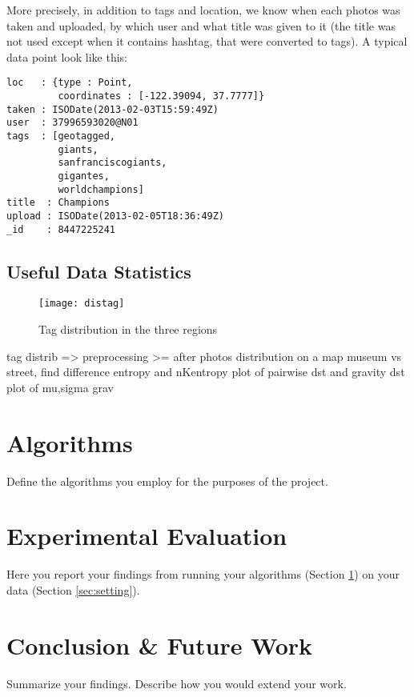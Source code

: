 More precisely, in addition to tags and location, we know when each photos was
taken and uploaded, by which user and what title was given to it (the title
was not used except when it contains hashtag, that were converted to tags). A
typical data point look like this:

\begin{verbatim}
loc   : {type : Point,
         coordinates : [-122.39094, 37.7777]}
taken : ISODate(2013-02-03T15:59:49Z)
user  : 37996593020@N01
tags  : [geotagged,
         giants,
         sanfranciscogiants,
         gigantes,
         worldchampions]
title  : Champions
upload : ISODate(2013-02-05T18:36:49Z)
_id    : 8447225241
\end{verbatim}

\subsection{Useful Data Statistics}

\begin{figure}[hbtp]
\texttt{[image: distag]}
\label{fig:distag}
\caption{Tag distribution in the three regions}
\end{figure}

tag distrib => preprocessing >= after
photos distribution on a map
museum vs street, find difference
entropy and nKentropy
plot of pairwise dst and gravity dst
plot of mu,sigma grav
\section{Algorithms}
\label{sec:algorithms}

Define the algorithms you employ for the purposes of the project.

\section{Experimental Evaluation}

Here you report your findings from running your algorithms (Section
\ref{sec:algorithms}) on your data (Section \ref{sec:setting}).

\section{Conclusion \& Future Work}

\balance
Summarize your findings. Describe how you would extend your work.




